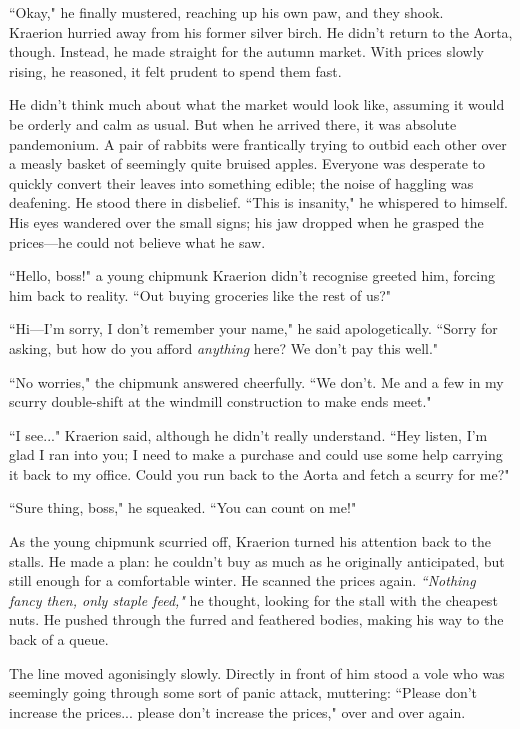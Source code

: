``Okay," he finally mustered, reaching up his own paw, and they shook.\\


Kraerion hurried away from his former silver birch.
He didn't return to the Aorta, though.
Instead, he made straight for the autumn market.
With prices slowly rising, he reasoned, it felt prudent to spend them fast.

He didn't think much about what the market would look like, assuming it would be orderly and calm as usual.
But when he arrived there, it was absolute pandemonium.
A pair of rabbits were frantically trying to outbid each other over a measly basket of seemingly quite bruised apples.
Everyone was desperate to quickly convert their leaves into something edible; the noise of haggling was deafening.
He stood there in disbelief.
``This is insanity," he whispered to himself.
His eyes wandered over the small signs; his jaw dropped when he grasped the prices---he could not believe what he saw.

``Hello, boss!" a young chipmunk Kraerion didn't recognise greeted him, forcing him back to reality.
``Out buying groceries like the rest of us?"

``Hi---I'm sorry, I don't remember your name," he said apologetically.
``Sorry for asking, but how do you afford \textit{anything} here?
We don't pay this well."

``No worries," the chipmunk answered cheerfully.
``We don't.
Me and a few in my scurry double-shift at the windmill construction to make ends meet."

``I see..." Kraerion said, although he didn't really understand.
``Hey listen, I'm glad I ran into you; I need to make a purchase and could use some help carrying it back to my office.
Could you run back to the Aorta and fetch a scurry for me?"

``Sure thing, boss," he squeaked.
``You can count on me!"

As the young chipmunk scurried off, Kraerion turned his attention back to the stalls.
He made a plan: he couldn't buy as much as he originally anticipated, but still enough for a comfortable winter.
He scanned the prices again.
\textit{``Nothing fancy then, only staple feed,"} he thought, looking for the stall with the cheapest nuts.
He pushed through the furred and feathered bodies, making his way to the back of a queue.

The line moved agonisingly slowly.
Directly in front of him stood a vole who was seemingly going through some sort of panic attack, muttering:
``Please don't increase the prices... please don't increase the prices," over and over again.

